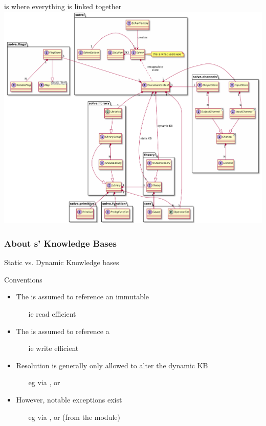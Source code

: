 \documentclass[handout]{beamer}
\begin{document}
\begin{frame}{ is where everything is linked together}
    \centering
    \includegraphics[width=.75\linewidth]{img/solve.pdf}
\end{frame}

\subsubsection{About s' Knowledge Bases}

\begin{frame}[allowframebreaks]{Static vs. Dynamic Knowledge bases}
    \begin{alertblock}{Conventions}
        \begin{itemize}
            \item The  is assumed to reference an \alert{immutable} 
            \begin{itemize}
                \item[ie] read efficient
            \end{itemize}

            \item The  is assumed to reference a 
            \begin{itemize}
                \item[ie] write efficient
            \end{itemize}

            \item Resolution is generally only allowed to alter the \alert{dynamic} KB
            \begin{itemize}
                \item[eg] via , or 
            \end{itemize}

            \item However, notable exceptions exist
            \begin{itemize}
                \item[eg] via , or  (from the  module)
            \end{itemize}
        \end{itemize}
    \end{alertblock}
\end{frame}
\end{document}
